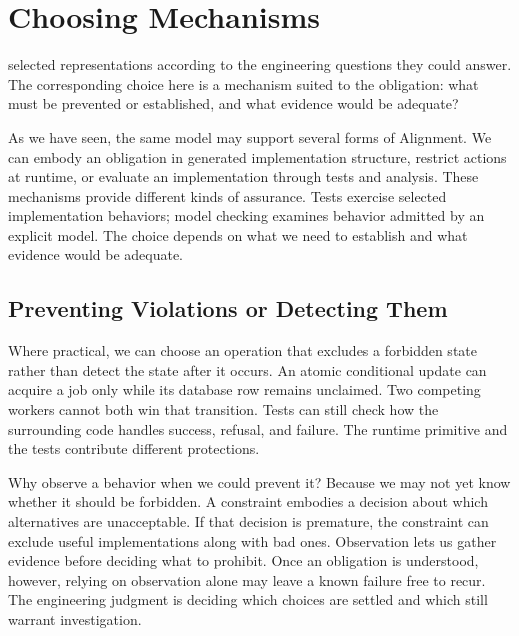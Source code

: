\section{Choosing Mechanisms}\label{heading:one-obligation-several-ways-to-hold-it}

 selected representations according to the engineering questions they could answer. The corresponding choice here is a mechanism suited to the obligation: what must be prevented or established, and what evidence would be adequate?



As we have seen, the same model may support several forms of Alignment. We can embody an obligation in generated implementation structure, restrict actions at runtime, or evaluate an implementation through tests and analysis. These mechanisms provide different kinds of assurance. Tests exercise selected implementation behaviors; model checking examines behavior admitted by an explicit model. The choice depends on what we need to establish and what evidence would be adequate.

\subsection{Preventing Violations or Detecting Them}\label{heading:preventing-violations-or-detecting-them}


Where practical, we can choose an operation that excludes a forbidden state rather than detect the state after it occurs. An atomic conditional update can acquire a job only while its database row remains unclaimed. Two competing workers cannot both win that transition. Tests can still check how the surrounding code handles success, refusal, and failure. The runtime primitive and the tests contribute different protections.

Why observe a behavior when we could prevent it? Because we may not yet know whether it should be forbidden. A constraint embodies a decision about which alternatives are unacceptable. If that decision is premature, the constraint can exclude useful implementations along with bad ones. Observation lets us gather evidence before deciding what to prohibit. Once an obligation is understood, however, relying on observation alone may leave a known failure free to recur. The engineering judgment is deciding which choices are settled and which still warrant investigation.

